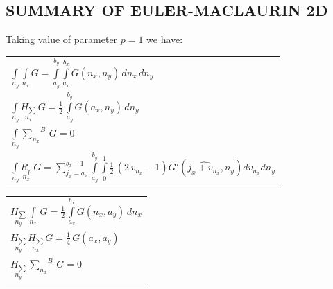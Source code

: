 \documentclass[twoside, 10pt, ptm]{article}
\begin{document}
\begin{multicols}{2}

    \section*{\centering\uppercase{Summary of Euler-Maclaurin
2D}}\label{summary-of-eulermaclaurin-2d}
\vspace{-3.5mm}


Taking value of parameter \(p = 1\) we have:

    \begin{center}
\begin{tabular}{ l }

$\int\limits_{n_y}^{} \int\limits_{n_x}^{} G = \int\limits_{a_{y}}^{b_{y}} \int\limits_{a_{x}}^{b_{x}} G\left(n_{x}, n_{y}\right)\,{d n_{x}}\,{d n_{y}}$ \\

$\int\limits_{n_y}^{} \underset{n_x}{H_{\sum}}\,G = \frac{1}{2} \, \int\limits_{a_{y}}^{b_{y}} G\left(a_{x}, n_{y}\right)\,{d n_{y}}$ \\

$\int\limits_{n_y}^{} {\sum\limits_{n_x}^{}}^{B}\,G = 0$ \\

$\int\limits_{n_y}^{} \underset{n_x}{R_{p}}\,G = {\sum\limits_{j_{x}=a_{x}}^{b_{x} - 1} \int\limits_{a_{y}}^{b_{y}} \int\limits_{0}^{1} \frac{1}{2} \, {\left(2 \, v_{n_{x}} - 1\right)} G'\left(\widehat{j_{x} + v_{n_{x}}}, n_{y}\right){d v_{n_{x}}}{d n_{y}}}$ \\


\end{tabular}
\end{center}

    \begin{center}
\begin{tabular}{ l }


$\underset{n_y}{H_{\sum}}\,\int\limits_{n_x}^{}\,G = \frac{1}{2} \, \int\limits_{a_{x}}^{b_{x}} G\left(n_{x}, a_{y}\right)\,{d n_{x}}$ \\

$\underset{n_y}{H_{\sum}}\,\underset{n_x}{H_{\sum}}\,G = \frac{1}{4} \, G\left(a_{x}, a_{y}\right)$ \\

$\underset{n_y}{H_{\sum}}\,{\sum\limits_{n_x}^{}}^{B}\,G = 0$ \\


\end{tabular}
\end{center}
\end{multicols}
\end{document}

